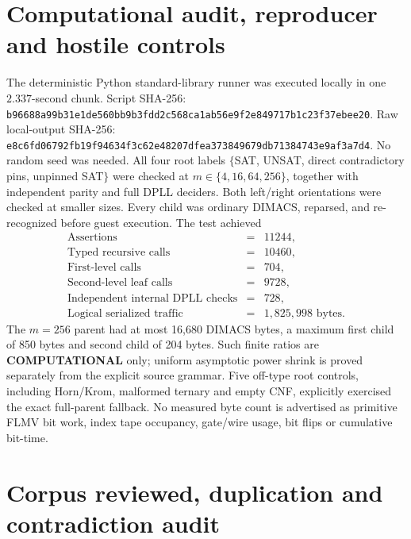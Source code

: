 \documentclass[11pt]{article}
\begin{document}
\section{Computational audit, reproducer and hostile controls}

The deterministic Python standard-library runner
was executed locally in one $2.337$-second chunk.
Script SHA-256:
\texttt{b96688a99b31e1de560bb9b3fdd2c568ca1ab56e9f2e849717b1c23f37ebee20}.
Raw local-output SHA-256:
\texttt{e8c6fd06792fb19f94634f3c62e48207dfea373849679db71384743e9af3a7d4}.
No random seed was needed. All four root labels
$\{$SAT, UNSAT, direct contradictory pins, unpinned
SAT$\}$ were checked at $m\in\{4,16,64,256\}$,
together with independent parity and full DPLL
deciders. Both left/right orientations were checked
at smaller sizes. Every child was ordinary DIMACS,
reparsed, and re-recognized before guest execution.
The test achieved
\[
\begin{array}{rcl}
 \text{Assertions}&=&11244,\\
 \text{Typed recursive calls}&=&10460,\\
 \text{First-level calls}&=&704,\\
 \text{Second-level leaf calls}&=&9728,\\
 \text{Independent internal DPLL checks}&=&728,\\
 \text{Logical serialized traffic}&=&1{,}825{,}998\text{ bytes}.
\end{array}
\]
The $m=256$ parent had at most 16,680 DIMACS
bytes, a maximum first child of 850 bytes and
second child of 204 bytes. Such finite ratios are
\textbf{COMPUTATIONAL} only; uniform asymptotic
power shrink is proved separately from the
explicit source grammar. Five off-type root
controls, including Horn/Krom, malformed
ternary and empty CNF, explicitly exercised
the exact full-parent fallback. No measured
byte count is advertised as primitive FLMV
bit work, index tape occupancy, gate/wire
usage, bit flips or cumulative bit-time.

\section{Corpus reviewed, duplication and contradiction audit}
\end{document}
